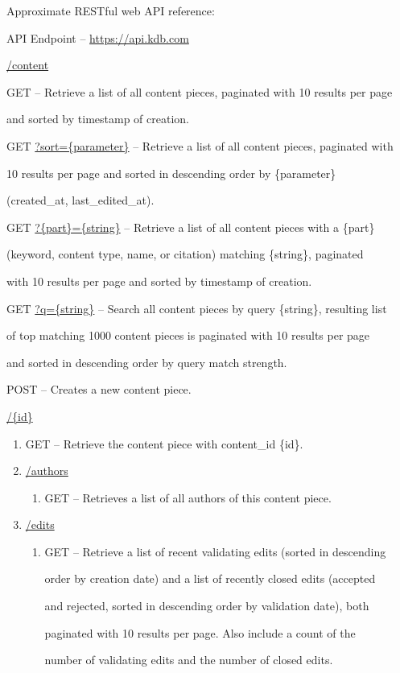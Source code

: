 \documentclass[12pt,letterpaper]{article}
\begin{document}
Approximate RESTful web API reference:

\begin{myEnumerate}
\item[] API Endpoint -- \url{https://api.kdb.com}
\begin{myEnumerate}
\item[] \url{/content}
\begin{myEnumerate}
\item[] GET -- Retrieve a list of all content pieces, paginated with 10 results per page \par and sorted by timestamp of creation.
\item[] GET \url{?sort={parameter}} -- Retrieve a list of all content pieces, paginated with \par 10 results per page and sorted in descending order by \{parameter\} \par (created\_at, last\_edited\_at).
\item[] GET \url{?{part}={string}} -- Retrieve a list of all content pieces with a \{part\} \par (keyword, content type, name, or citation) matching \{string\}, paginated \par with 10 results per page and sorted by timestamp of creation.
\item[] GET \url{?q={string}} -- Search all content pieces by query \{string\}, resulting list \par of top matching 1000 content pieces is paginated with 10 results per page \par and sorted in descending order by query match strength.
\item[] POST -- Creates a new content piece.
\item[] \url{/{id}}
\begin{enumerate}
\item[] GET -- Retrieve the content piece with content\_id \{id\}.
\item[] \url{/authors} 
\begin{enumerate}
\item[] GET -- Retrieves a list of all authors of this content piece.
\end{enumerate}
\item[] \url{/edits} \begin{enumerate}
\item[] GET -- Retrieve a list of recent validating edits (sorted in descending \par order by creation date) and a list of recently closed edits (accepted \par and rejected, sorted in descending order by validation date), both \par paginated with 10 results per page. Also include a count of the \par number of validating edits and the number of closed edits.

\end{enumerate}
\end{enumerate}
\end{myEnumerate}
\end{myEnumerate}
\end{myEnumerate}
\end{document}

